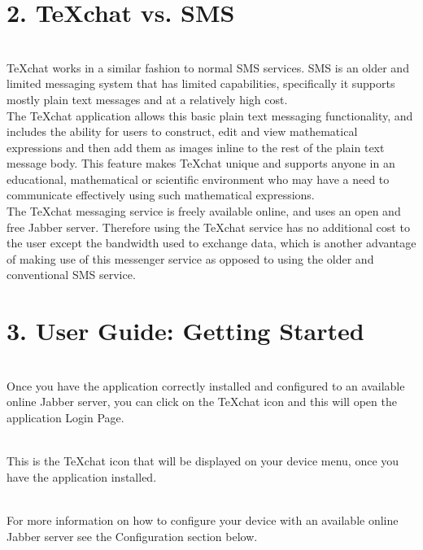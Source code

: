 \documentclass[29pt,a4paper]{moderncv}
\begin{document}
\newpage
\section*{\textbf{2. TeXchat vs. SMS}}
	\vspace{4mm}
		 \\TeXchat works in a similar fashion to normal SMS services. SMS is an older and limited messaging system that has limited capabilities, specifically it supports mostly plain text messages and at a relatively high cost. \\ 
		 
		 The TeXchat application allows this basic plain text messaging functionality, and includes the ability for users to construct, edit and view mathematical expressions and then add them as images inline to the rest of the plain text message body.  This feature makes TeXchat unique and supports anyone in an educational, mathematical or scientific environment who may have a need to communicate effectively using such mathematical expressions. \\  
		 
		 The TeXchat messaging service is freely available online, and uses an open and free Jabber server.  Therefore using the TeXchat service has no additional cost to the user except the bandwidth used to exchange data, which is another advantage of making use of this messenger service as opposed to using the older and conventional SMS service.   \\
	\vspace{5mm}
		
\newpage
	\section*{3. User Guide: Getting Started}
	\vspace{4mm}
	\\Once you have the application correctly installed and configured to an available online Jabber server, you can click on the TeXchat icon and this will open the application Login Page.  
	
	\\This is the TeXchat icon that will be displayed on your device menu, once you have the application installed.
	
	\\For more information on how to configure your device with an available online Jabber server see the Configuration section below.
	
	\vspace{5mm}
\end{document}
